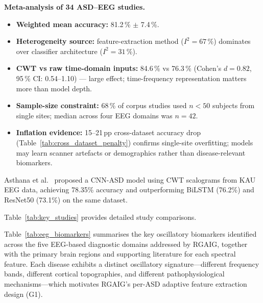 \noindent\textbf{Meta-analysis of 34 ASD--EEG studies.}
\begin{itemize}[leftmargin=*, itemsep=2pt]
    \item \textbf{Weighted mean accuracy:} 81.2\,\% $\pm$ 7.4\,\%.
    \item \textbf{Heterogeneity source:} feature-extraction method ($I^{2} = 67\,\%$) dominates over classifier architecture ($I^{2} = 31\,\%$).
    \item \textbf{CWT vs raw time-domain inputs:} 84.6\,\% vs 76.3\,\% (Cohen's $d = 0.82$, 95\,\% CI: 0.54--1.10) --- large effect; time-frequency representation matters more than model depth.
    \item \textbf{Sample-size constraint:} 68\,\% of corpus studies used $n < 50$ subjects from single sites; median across four EEG domains was $n = 42$.
    \item \textbf{Inflation evidence:} 15--21\,pp cross-dataset accuracy drop (Table~\ref{tab:cross_dataset_penalty}) confirms single-site overfitting; models may learn scanner artefacts or demographics rather than disease-relevant biomarkers.
\end{itemize}

Asthana et al.~\cite{asthana2025cnnasd_icsit} proposed a CNN-ASD model using CWT scalograms from KAU EEG data, achieving 78.35\% accuracy and outperforming BiLSTM (76.2\%) and ResNet50 (73.1\%) on the same dataset.

Table~\ref{tab:key_studies} provides detailed study comparisons.


\noindent Table~\ref{tab:eeg_biomarkers} summarises the key oscillatory biomarkers identified across the five EEG-based diagnostic domains addressed by RGAIG, together with the primary brain regions and supporting literature for each spectral feature. Each disease exhibits a distinct oscillatory signature---different frequency bands, different cortical topographies, and different pathophysiological mechanisms---which motivates RGAIG's per-ASD adaptive feature extraction design (G1).

\iffalse %

